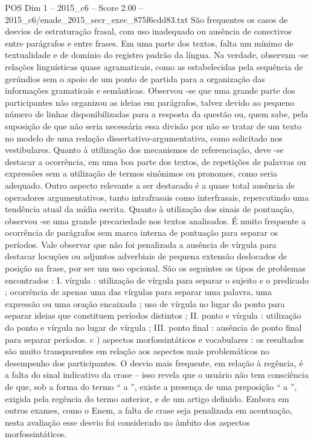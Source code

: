 \begin{textsample}{POS Dim 1 – 2015\_c6 – Score 2.00 – 2015\_c6/enade\_2015\_secr\_exec\_875f6cdd83.txt}
São frequentes os casos de desvios de estruturação frasal, com uso inadequado ou ausência de conectivos entre parágrafos e entre frases.
Em uma parte dos textos, falta um mínimo de textualidade e de domínio do registro padrão da língua.
Na verdade, observam -se relações linguísticas quase agramaticais, como as estabelecidas pela sequência de gerúndios sem o apoio de um ponto de partida para a organização das informações gramaticais e semânticas.
Observou -se que uma grande parte dos participantes não organizou as ideias em parágrafos, talvez devido ao pequeno número de linhas disponibilizadas para a resposta da questão ou, quem sabe, pela suposição de que não seria necessária essa divisão por não se tratar de um texto no modelo de uma redação dissertativo-argumentativa, como solicitado nos vestibulares.
Quanto à utilização dos mecanismos de referenciação, deve -se destacar a ocorrência, em uma boa parte dos textos, de repetições de palavras ou expressões sem a utilização de termos sinônimos ou pronomes, como seria adequado.
Outro aspecto relevante a ser destacado é a quase total ausência de operadores argumentativos, tanto intrafrasais como interfrasais, repercutindo uma tendência atual da mídia escrita.
Quanto à utilização dos sinais de pontuação, observou -se uma grande precariedade nos textos analisados.
É muito frequente a ocorrência de parágrafos sem marca interna de pontuação para separar os períodos.
Vale observar que não foi penalizada a ausência de vírgula para destacar locuções ou adjuntos adverbiais de pequena extensão deslocados de posição na frase, por ser um uso opcional.
São os seguintes os tipos de problemas encontrados : I. vírgula : utilização de vírgula para separar o sujeito e o predicado ; ocorrência de apenas uma das vírgulas para separar uma palavra, uma expressão ou uma oração encaixada ; uso de vírgula no lugar do ponto para separar ideias que constituem períodos distintos ; II. ponto e vírgula : utilização do ponto e vírgula no lugar de vírgula ; III. ponto final : ausência de ponto final para separar períodos. c ) aspectos morfossintáticos e vocabulares : os resultados são muito transparentes em relação aos aspectos mais problemáticos no desempenho dos participantes.
O desvio mais frequente, em relação à regência, é a falta do sinal indicativo da crase – isso revela que o usuário não tem consciência de que, sob a forma do termo “ a ”, existe a presença de uma preposição “ a ”, exigida pela regência do termo anterior, e de um artigo definido.
Embora em outros exames, como o Enem, a falta de crase seja penalizada em acentuação, nesta avaliação esse desvio foi considerado no âmbito dos aspectos morfossintáticos.

\end{textsample}
